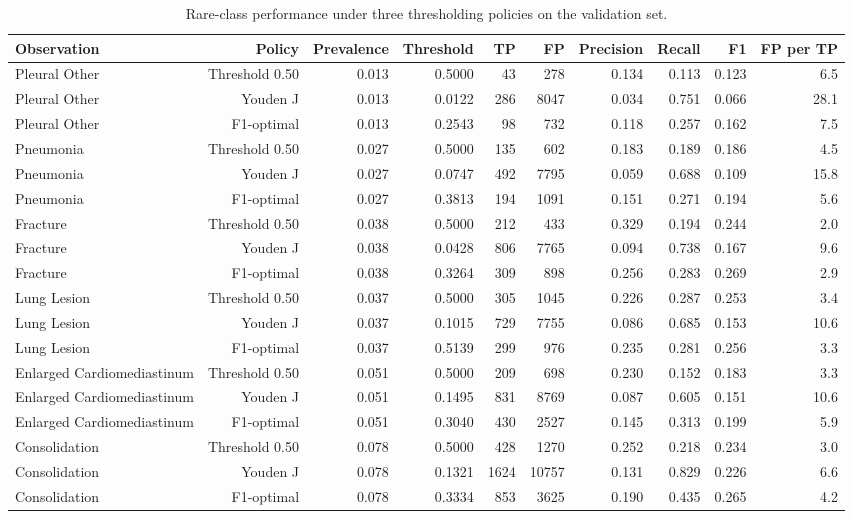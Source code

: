 \begin{table}[t]
\centering
\small
\begin{tabular}{lrrrrrrrrr}
\hline
Observation & Policy & Prevalence & Threshold & TP & FP & Precision & Recall & F1 & FP per TP \\
\hline
Pleural Other & Threshold 0.50 & 0.013 & 0.5000 & 43 & 278 & 0.134 & 0.113 & 0.123 & 6.5 \\
Pleural Other & Youden J & 0.013 & 0.0122 & 286 & 8047 & 0.034 & 0.751 & 0.066 & 28.1 \\
Pleural Other & F1-optimal & 0.013 & 0.2543 & 98 & 732 & 0.118 & 0.257 & 0.162 & 7.5 \\
Pneumonia & Threshold 0.50 & 0.027 & 0.5000 & 135 & 602 & 0.183 & 0.189 & 0.186 & 4.5 \\
Pneumonia & Youden J & 0.027 & 0.0747 & 492 & 7795 & 0.059 & 0.688 & 0.109 & 15.8 \\
Pneumonia & F1-optimal & 0.027 & 0.3813 & 194 & 1091 & 0.151 & 0.271 & 0.194 & 5.6 \\
Fracture & Threshold 0.50 & 0.038 & 0.5000 & 212 & 433 & 0.329 & 0.194 & 0.244 & 2.0 \\
Fracture & Youden J & 0.038 & 0.0428 & 806 & 7765 & 0.094 & 0.738 & 0.167 & 9.6 \\
Fracture & F1-optimal & 0.038 & 0.3264 & 309 & 898 & 0.256 & 0.283 & 0.269 & 2.9 \\
Lung Lesion & Threshold 0.50 & 0.037 & 0.5000 & 305 & 1045 & 0.226 & 0.287 & 0.253 & 3.4 \\
Lung Lesion & Youden J & 0.037 & 0.1015 & 729 & 7755 & 0.086 & 0.685 & 0.153 & 10.6 \\
Lung Lesion & F1-optimal & 0.037 & 0.5139 & 299 & 976 & 0.235 & 0.281 & 0.256 & 3.3 \\
Enlarged Cardiomediastinum & Threshold 0.50 & 0.051 & 0.5000 & 209 & 698 & 0.230 & 0.152 & 0.183 & 3.3 \\
Enlarged Cardiomediastinum & Youden J & 0.051 & 0.1495 & 831 & 8769 & 0.087 & 0.605 & 0.151 & 10.6 \\
Enlarged Cardiomediastinum & F1-optimal & 0.051 & 0.3040 & 430 & 2527 & 0.145 & 0.313 & 0.199 & 5.9 \\
Consolidation & Threshold 0.50 & 0.078 & 0.5000 & 428 & 1270 & 0.252 & 0.218 & 0.234 & 3.0 \\
Consolidation & Youden J & 0.078 & 0.1321 & 1624 & 10757 & 0.131 & 0.829 & 0.226 & 6.6 \\
Consolidation & F1-optimal & 0.078 & 0.3334 & 853 & 3625 & 0.190 & 0.435 & 0.265 & 4.2 \\
\hline
\end{tabular}
\caption{Rare-class performance under three thresholding policies on the validation set.}
\label{tab:table3_rare_class_performance}
\end{table}
